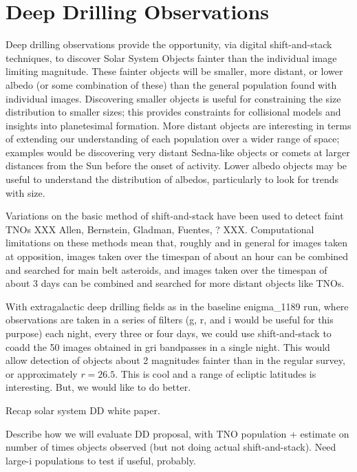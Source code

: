 \navigationbar

%
%

\section{Deep Drilling Observations}
\def\secname{\chpname:dd}\label{sec:\secname}

Deep drilling observations provide the opportunity, via digital
shift-and-stack techniques, to discover Solar System Objects fainter
than the individual image limiting magnitude. These fainter objects
will be smaller, more distant, or lower albedo (or some combination of these)
than the general population found with individual images. Discovering smaller
objects is useful for constraining the size distribution to smaller
sizes; this provides constraints for collisional models and insights
into planetesimal formation. More distant objects are interesting in
terms of extending our understanding of each population over a wider
range of space; examples would be discovering very distant
Sedna-like objects or comets at larger distances from the Sun before
the onset of activity. Lower albedo objects may be useful to
understand the distribution of albedos, particularly to look for
trends with size.

Variations on the basic method of shift-and-stack have been used to
detect faint TNOs XXX Allen, Bernstein, Gladman, Fuentes, ?
XXX. Computational limitations on these methods mean that, roughly
and in general for images taken at opposition, images taken over the timespan of about an hour can be
combined and searched for main belt asteroids, and images taken over
the timespan of about 3 days can be combined and searched for more
distant objects like TNOs.

With extragalactic deep drilling fields as in the baseline enigma\_1189
run, where observations are taken in a series of filters (g, r, and i
would be useful for this purpose) each night, every three or four
days, we could use shift-and-stack to coadd the 50 images obtained in
gri bandpasses in a single night. This would allow detection of
objects about 2 magnitudes fainter than in the regular survey, or
approximately $r=26.5$.  This is cool and a range of ecliptic
latitudes is interesting.  But, we would like to do better.

Recap solar system DD white paper.

Describe how we will evaluate DD proposal, with TNO population +
estimate on number of times objects observed (but not doing actual
shift-and-stack). Need large-i populations to test if useful, probably.


\navigationbar

